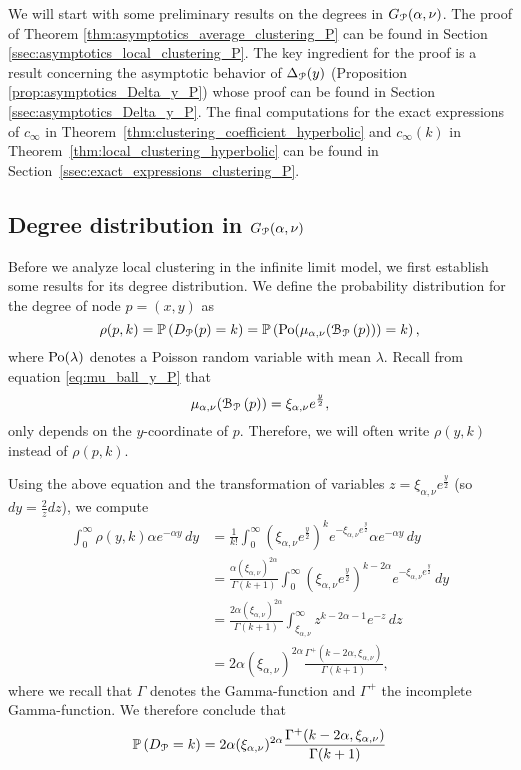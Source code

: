 We will start with some preliminary results on the degrees in $G_{{\mathcal P}}(\alpha, \nu)$. The proof of Theorem \ref{thm:asymptotics_average_clustering_P} can be found in Section \ref{ssec:asymptotics_local_clustering_P}. The key ingredient for the proof is a result concerning the asymptotic behavior of $\Delta_{{\mathcal P}}(y)$ (Proposition \ref{prop:asymptotics_Delta_y_P}) whose proof can be found in Section \ref{ssec:asymptotics_Delta_y_P}. The final computations for the exact expressions of $c_\infty$ in Theorem~\ref{thm:clustering_coefficient_hyperbolic} and $c_\infty(k)$ in Theorem~\ref{thm:local_clustering_hyperbolic} can be found in Section~\ref{ssec:exact_expressions_clustering_P}.

\subsection{Degree distribution in $G_{{\mathcal P}}(\alpha, \nu)$}

Before we analyze local clustering in the infinite limit model, we first establish some results for its degree distribution. We define the probability distribution for the degree of node $p = (x,y)$ as
\begin{equation}
	\rho(p,k) = \mathbb{P}\left(D_{{\mathcal P}}(p) = k\right) = \mathbb{P}\left({\mathrm{Po}}(\mu_{\alpha,\nu}({\mathcal B}_{{\mathcal P}}\left(p\right))) = k\right),
\end{equation}
where ${\mathrm{Po}}(\lambda)$ denotes a Poisson random variable with mean $\lambda$. Recall from equation \eqref{eq:mu_ball_y_P} that
\[
	\mu_{\alpha,\nu}({\mathcal B}_{{\mathcal P}}\left(p\right)) = \xi_{\alpha,\nu} e^{\frac{y}{2}},
\]
only depends on the $y$-coordinate of $p$. Therefore, we will often write $\rho(y,k)$ instead of $\rho(p,k)$.

Using the above equation and the transformation of variables $z = \xi_{\alpha,\nu}e^{\frac{y}{2}}$ (so $dy = \frac{2}{z}dz$), we compute
\begin{align*}
	\int_0^\infty \rho(y,k) \alpha e^{-\alpha y} \, dy 
    &= \frac{1}{k!} \int_0^\infty \left(\xi_{\alpha,\nu} e^{\frac{y}{2}}\right)^k 
    	e^{-\xi_{\alpha,\nu} e^{\frac{y}{2}}} \alpha e^{-\alpha y} \, dy\\
    &= \frac{\alpha (\xi_{\alpha,\nu})^{2\alpha}}{\Gamma(k+1)} \int_0^\infty 
    	\left(\xi_{\alpha,\nu} e^{\frac{y}{2}}\right)^{k - 2\alpha} e^{-\xi_{\alpha,\nu} e^{\frac{y}{2}}}
        \, dy\\
    &= \frac{2\alpha (\xi_{\alpha,\nu})^{2\alpha}}{\Gamma(k+1)} \int_{\xi_{\alpha,\nu}}^{\infty} 
    	z^{k -2\alpha-1} e^{-z} \, dz\\
    &=2\alpha (\xi_{\alpha,\nu})^{2\alpha} \frac{\Gamma^+(k - 2\alpha, \xi_{\alpha,\nu})}{\Gamma(k+1)},
\end{align*}
where we recall that $\Gamma$ denotes the Gamma-function and $\Gamma^{+}$ the incomplete Gamma-function.
We therefore conclude that
\begin{equation}\label{eq:degree_distribution_P}
	\mathbb{P}\left(D_{{\mathcal P}} = k\right) = 2\alpha (\xi_{\alpha,\nu})^{2\alpha} \frac{\Gamma^+(k - 2\alpha, \xi_{\alpha,\nu})}{\Gamma(k+1)}
\end{equation}

